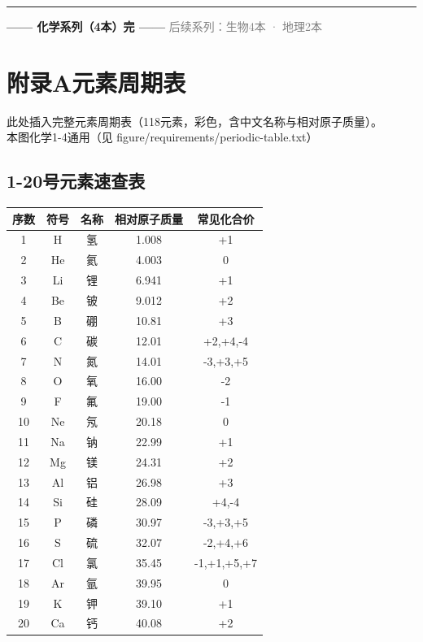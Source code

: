 \documentclass[a4paper,12pt]{ctexart}
\begin{document}
\vspace{0.5cm}
\begin{center}\rule{0.7\textwidth}{1pt}\vspace{0.4cm}
{\large\textcolor{blue!70!black}{\textbf{—— 化学系列（4本）完 ——}}}
\vspace{0.3cm}\textcolor{gray}{\small 后续系列：生物4本 · 地理2本}
\end{center}

\newpage

\appendix
\section*{\textcolor{blue!70!black}{附录A\quad 元素周期表}}

\begin{figplaceholder}
此处插入完整元素周期表（118元素，彩色，含中文名称与相对原子质量）。\\
本图化学1-4通用（见 figure/requirements/periodic-table.txt）
\end{figplaceholder}

\subsection*{1-20号元素速查表}

\begin{center}
\begin{tabular}{|c|c|c|c|c|}
\hline
\textbf{序数} & \textbf{符号} & \textbf{名称} & \textbf{相对原子质量} & \textbf{常见化合价} \\
\hline
1 & H & 氢 & 1.008 & +1 \\
2 & He & 氦 & 4.003 & 0 \\
3 & Li & 锂 & 6.941 & +1 \\
4 & Be & 铍 & 9.012 & +2 \\
5 & B & 硼 & 10.81 & +3 \\
6 & C & 碳 & 12.01 & +2,+4,-4 \\
7 & N & 氮 & 14.01 & -3,+3,+5 \\
8 & O & 氧 & 16.00 & -2 \\
9 & F & 氟 & 19.00 & -1 \\
10 & Ne & 氖 & 20.18 & 0 \\
11 & Na & 钠 & 22.99 & +1 \\
12 & Mg & 镁 & 24.31 & +2 \\
13 & Al & 铝 & 26.98 & +3 \\
14 & Si & 硅 & 28.09 & +4,-4 \\
15 & P & 磷 & 30.97 & -3,+3,+5 \\
16 & S & 硫 & 32.07 & -2,+4,+6 \\
17 & Cl & 氯 & 35.45 & -1,+1,+5,+7 \\
18 & Ar & 氩 & 39.95 & 0 \\
19 & K & 钾 & 39.10 & +1 \\
20 & Ca & 钙 & 40.08 & +2 \\
\hline
\end{tabular}
\end{center}
\end{document}
